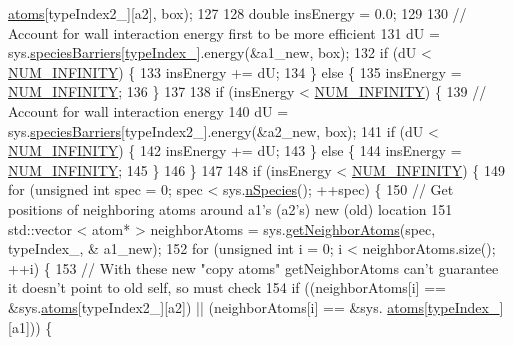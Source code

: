 \begin{DoxyCode}
      \hyperlink{classsim_system_a90421b19082f7fb8fc23b7264b1161e4}{atoms}[typeIndex2\_][a2], box);
127 
128     \textcolor{keywordtype}{double} insEnergy = 0.0;
129 
130     \textcolor{comment}{// Account for wall interaction energy first to be more efficient}
131     dU = sys.\hyperlink{classsim_system_a5ae652ff4519f39c3862abae32a9581b}{speciesBarriers}[\hyperlink{classmc_move_acb731965547b0326ef318ec96da8b46a}{typeIndex\_}].energy(&a1\_new, box);
132     \textcolor{keywordflow}{if} (dU < \hyperlink{potentials_8h_ab94ab1d09e2291d03fe92a0e24a9d33b}{NUM\_INFINITY}) \{
133         insEnergy += dU;
134     \} \textcolor{keywordflow}{else} \{
135         insEnergy = \hyperlink{potentials_8h_ab94ab1d09e2291d03fe92a0e24a9d33b}{NUM\_INFINITY};
136     \}
137 
138     \textcolor{keywordflow}{if} (insEnergy < \hyperlink{potentials_8h_ab94ab1d09e2291d03fe92a0e24a9d33b}{NUM\_INFINITY}) \{
139         \textcolor{comment}{// Account for wall interaction energy}
140         dU = sys.\hyperlink{classsim_system_a5ae652ff4519f39c3862abae32a9581b}{speciesBarriers}[typeIndex2\_].energy(&a2\_new, box);
141         \textcolor{keywordflow}{if} (dU < \hyperlink{potentials_8h_ab94ab1d09e2291d03fe92a0e24a9d33b}{NUM\_INFINITY}) \{
142             insEnergy += dU;
143         \} \textcolor{keywordflow}{else} \{
144             insEnergy = \hyperlink{potentials_8h_ab94ab1d09e2291d03fe92a0e24a9d33b}{NUM\_INFINITY};
145         \}
146     \}
147 
148     \textcolor{keywordflow}{if} (insEnergy < \hyperlink{potentials_8h_ab94ab1d09e2291d03fe92a0e24a9d33b}{NUM\_INFINITY}) \{
149         \textcolor{keywordflow}{for} (\textcolor{keywordtype}{unsigned} \textcolor{keywordtype}{int} spec = 0; spec < sys.\hyperlink{classsim_system_ab5e2e9b6204de15520302fe1d51688dd}{nSpecies}(); ++spec) \{
150             \textcolor{comment}{// Get positions of neighboring atoms around a1's (a2's) new (old) location}
151             std::vector < atom* > neighborAtoms = sys.\hyperlink{classsim_system_a9b3aeefa22c3b50b5913df6eea753bc6}{getNeighborAtoms}(spec, typeIndex\_, &
      a1\_new);
152             \textcolor{keywordflow}{for} (\textcolor{keywordtype}{unsigned} \textcolor{keywordtype}{int} i = 0; i < neighborAtoms.size(); ++i) \{
153                 \textcolor{comment}{// With these new "copy atoms" getNeighborAtoms can't guarantee it doesn't point to old
       self, so must check}
154                 \textcolor{keywordflow}{if} ((neighborAtoms[i] == &sys.\hyperlink{classsim_system_a90421b19082f7fb8fc23b7264b1161e4}{atoms}[typeIndex2\_][a2]) || (neighborAtoms[i] == &sys.
      \hyperlink{classsim_system_a90421b19082f7fb8fc23b7264b1161e4}{atoms}[\hyperlink{classmc_move_acb731965547b0326ef318ec96da8b46a}{typeIndex\_}][a1])) \{

\end{DoxyCode}
